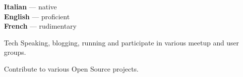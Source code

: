 \documentclass[9pt]{developercv}
\begin{document}
\begin{minipage}[t]{0.3\textwidth}
    \vspace{-\baselineskip}


    \textbf{Italian} --- native\\
    \textbf{English} --- proficient\\
    \textbf{French} --- rudimentary
\end{minipage}
\hfill
\begin{minipage}[t]{0.3\textwidth}
    \vspace{-\baselineskip}


    Tech Speaking, blogging, running and participate in various meetup and user groups.
\end{minipage}
\hfill
\begin{minipage}[t]{0.3\textwidth}
    \vspace{-\baselineskip}


    Contribute to various Open Source projects.
\end{minipage}

\end{document}
